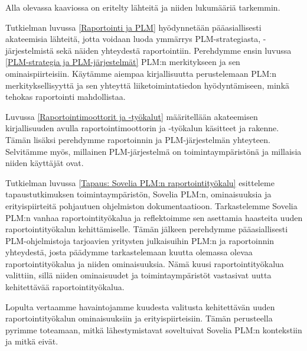 Alla olevassa kaaviossa on eritelty lähteitä ja niiden lukumääriä tarkemmin.


Tutkielman luvussa \ref{Raportointi ja PLM} hyödynnetään pääasiallisesti akateemisia lähteitä, jotta voidaan luoda ymmärrys PLM-strategiasta, -järjestelmistä sekä näiden yhteydestä raportointiin. Perehdymme ensin luvussa \ref{PLM-strategia ja PLM-järjestelmät} PLM:n merkitykseen ja sen ominaispiirteisiin. Käytämme aiempaa kirjallisuutta perustelemaan PLM:n merkityksellisyyttä ja sen yhteyttä liiketoimintatiedon hyödyntämiseen, minkä tehokas raportointi mahdollistaa.

Luvussa \ref{Raportointimoottorit ja -työkalut} määritellään akateemisen kirjallisuuden avulla raportointimoottorin ja -työkalun käsitteet ja rakenne. Tämän lisäksi perehdymme raportoinnin ja PLM-järjestelmän yhteyteen. Selvitämme myös, millainen PLM-järjestelmä on toimintaympäristönä ja millaisia niiden käyttäjät ovat.

Tutkielman luvussa \ref{Tapaus: Sovelia PLM:n raportointityökalu} esitteleme tapaustutkimuksen toimintaympäristön, Sovelia PLM:n, ominaisuuksia ja erityispiirteitä pohjautuen ohjelmiston dokumentaatioon. Tarkastelemme Sovelia PLM:n vanhaa raportointityökalua ja reflektoimme sen asettamia haasteita uuden raportointityökalun kehittämiselle. Tämän jälkeen perehdymme pääasiallisesti PLM-ohjelmistoja tarjoavien yritysten julkaisuihin PLM:n ja raportoinnin yhteydestä, josta päädymme tarkastelemaan kuutta olemassa olevaa raportointityökalua ja niiden ominaisuuksia. Nämä kuusi raportointityökalua valittiin, sillä niiden ominaisuudet ja toimintaympäristöt vastasivat uutta kehitettävää raportointityökalua.

Lopulta vertaamme havaintojamme kuudesta valitusta kehitettävän uuden raportointityökalun ominaisuuksiin ja erityispiirteisiin. Tämän perusteella pyrimme toteamaan, mitkä lähestymistavat soveltuivat Sovelia PLM:n kontekstiin ja mitkä eivät.

